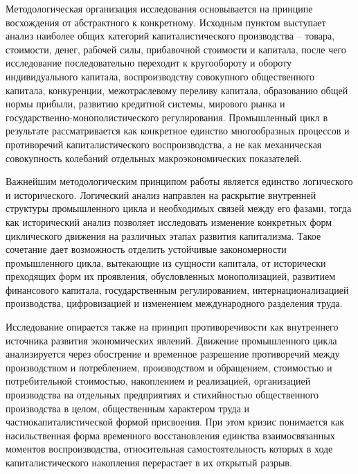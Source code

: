 Методологическая организация исследования основывается на принципе восхождения от абстрактного к конкретному. Исходным пунктом выступает анализ наиболее общих категорий капиталистического производства – товара, стоимости, денег, рабочей силы, прибавочной стоимости и капитала, после чего исследование последовательно переходит к кругообороту и обороту индивидуального капитала, воспроизводству совокупного общественного капитала, конкуренции, межотраслевому переливу капитала, образованию общей нормы прибыли, развитию кредитной системы, мирового рынка и государственно-монополистического регулирования. Промышленный цикл в результате рассматривается как конкретное единство многообразных процессов и противоречий капиталистического воспроизводства, а не как механическая совокупность колебаний отдельных макроэкономических показателей.

Важнейшим методологическим принципом работы является единство логического и исторического. Логический анализ направлен на раскрытие внутренней структуры промышленного цикла и необходимых связей между его фазами, тогда как исторический анализ позволяет исследовать изменение конкретных форм циклического движения на различных этапах развития капитализма. Такое сочетание дает возможность отделить устойчивые закономерности промышленного цикла, вытекающие из сущности капитала, от исторически преходящих форм их проявления, обусловленных монополизацией, развитием финансового капитала, государственным регулированием, интернационализацией производства, цифровизацией и изменением международного разделения труда.

Исследование опирается также на принцип противоречивости как внутреннего источника развития экономических явлений. Движение промышленного цикла анализируется через обострение и временное разрешение противоречий между производством и потреблением, производством и обращением, стоимостью и потребительной стоимостью, накоплением и реализацией, организацией производства на отдельных предприятиях и стихийностью общественного производства в целом, общественным характером труда и частнокапиталистической формой присвоения. При этом кризис понимается как насильственная форма временного восстановления единства взаимосвязанных моментов воспроизводства, относительная самостоятельность которых в ходе капиталистического накопления перерастает в их открытый разрыв.

